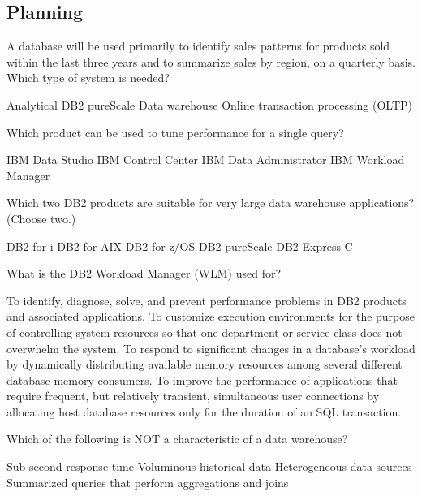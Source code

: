 \documentclass[11pt]{exam}
\begin{document}
\begin{questions}

\section{Planning}

\addpoints
\question[1]
A database will be used primarily to identify sales patterns
for products sold within the last three years and to summarize
sales by region, on a quarterly basis. Which type of system is 
needed?
\begin{choices}
\choice Analytical
\choice DB2 pureScale
\choice Data warehouse
\choice Online transaction processing (OLTP)
\end{choices}

\question[1]
Which product can be used to tune performance for a single query?
\begin{choices}
\choice IBM Data Studio
\choice IBM Control Center
\choice IBM Data Administrator
\choice IBM Workload Manager
\end{choices}

\question[1]
Which two DB2 products are suitable for very large data warehouse applications? (Choose two.)
\begin{choices}
\choice DB2 for i
\choice DB2 for AIX
\choice DB2 for z/OS
\choice DB2 pureScale
\choice DB2 Express-C
\end{choices}

\question[1]
What is the DB2 Workload Manager (WLM) used for?
\begin{choices}
\choice To identify, diagnose, solve, and prevent performance problems in DB2 products and associated applications.
\choice To customize execution environments for the purpose of controlling system resources so that one
		department or service class does not overwhelm the system.
\choice To respond to significant changes in a database's workload by dynamically distributing available memory resources
		among several different database memory consumers.
\choice To improve the performance of applications that require frequent, but relatively transient, simultaneous user
		connections by allocating host database resources only for the duration of an SQL transaction.
\end{choices}

\question[1]
Which of the following is NOT a characteristic of a data warehouse?
\begin{choices}
\choice Sub-second response time
\choice Voluminous historical data
\choice Heterogeneous data sources
\choice Summarized queries that perform aggregations and joins
\end{choices}


\end{questions}
\end{document}

